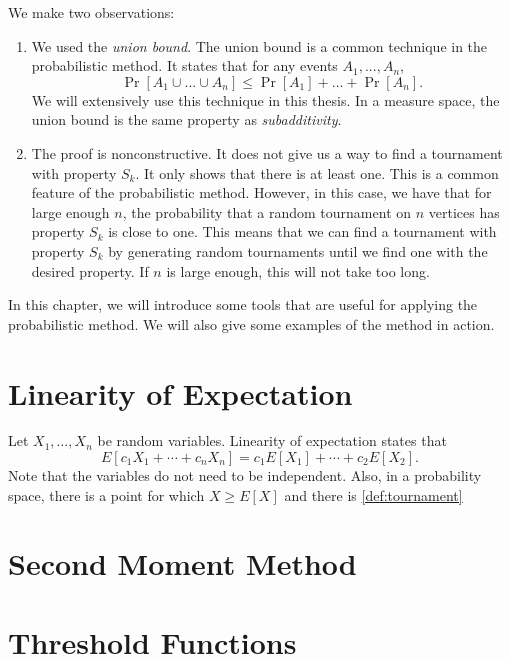 We make two observations: 
\begin{enumerate}
    \item We used the \textit{union bound}. The union bound is a common technique in the probabilistic method. It states that for any events $A_1, ..., A_n$,
    \[\Pr[A_1 \cup ... \cup A_n] \leq \Pr[A_1] + ... + \Pr[A_n].\]
    We will extensively use this technique in this thesis. In a measure space, the union bound is the same property as \textit{subadditivity}. \par
    \item The proof is nonconstructive. It does not give us a way to find a tournament with property $S_k$. It only shows that there is at least one. This is a common feature of the probabilistic method. However, in this case, we have that for large enough $n$, the probability that a random tournament on $n$ vertices has property $S_k$ is close to one. This means that we can find a tournament with property $S_k$ by generating random tournaments until we find one with the desired property. If $n$ is large enough, this will not take too long. \par
\end{enumerate}
In this chapter, we will introduce some tools that are useful for applying the probabilistic method. We will also give some examples of the method in action. \par

\section{Linearity of Expectation}\label{sec:probmet:linearity}

Let $X_1, \ldots, X_n$ be random variables. Linearity of expectation states that 
\[E[c_1X_1 + \cdots + c_nX_n] = c_1E[X_1] + \cdots + c_2E[X_2].\]
Note that the variables do not need to be independent. Also, in a probability space, there is a point for which $X \geq E[X]$ and there is \ref{def:tournament}

\section{Second Moment Method}\label{sec:probmet:secondmoment}

\section{Threshold Functions}\label{sec:probmet:threshold}

